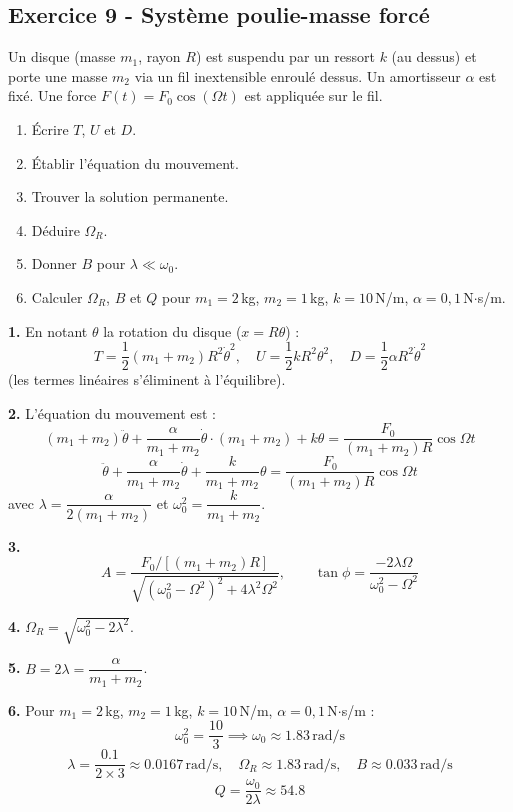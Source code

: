 \documentclass[12pt,a4paper]{article}
\begin{document}
\subsection*{Exercice 9 - Système poulie-masse forcé \niveau{\difficile}}

\begin{boiteexercice}
Un disque (masse $m_1$, rayon $R$) est suspendu par un ressort $k$ (au dessus) et porte une masse $m_2$ via un fil inextensible enroulé dessus. Un amortisseur $\alpha$ est fixé. Une force $F(t) = F_0\cos(\Omega t)$ est appliquée sur le fil.
\begin{enumerate}
  \item Écrire $T$, $U$ et $D$.
  \item Établir l'équation du mouvement.
  \item Trouver la solution permanente.
  \item Déduire $\Omega_R$.
  \item Donner $B$ pour $\lambda \ll \omega_0$.
  \item Calculer $\Omega_R$, $B$ et $Q$ pour $m_1=2$\,kg, $m_2=1$\,kg, $k=10$\,N/m, $\alpha=0{,}1$\,N$\cdot$s/m.
\end{enumerate}
\end{boiteexercice}

\begin{boitecorrige}
\textbf{1.} En notant $\theta$ la rotation du disque ($x = R\theta$) :
\[
T = \frac{1}{2}(m_1+m_2)R^2\dot\theta^2, \quad U = \frac{1}{2}kR^2\theta^2, \quad D = \frac{1}{2}\alpha R^2\dot\theta^2
\]
(les termes linéaires s'éliminent à l'équilibre).

\textbf{2.} L'équation du mouvement est :
\[
(m_1+m_2)\ddot\theta + \frac{\alpha}{m_1+m_2}\dot\theta\cdot(m_1+m_2) + k\theta = \frac{F_0}{(m_1+m_2)R}\cos\Omega t
\]
\[
\ddot\theta + \frac{\alpha}{m_1+m_2}\dot\theta + \frac{k}{m_1+m_2}\theta = \frac{F_0}{(m_1+m_2)R}\cos\Omega t
\]
avec $\lambda = \dfrac{\alpha}{2(m_1+m_2)}$ et $\omega_0^2 = \dfrac{k}{m_1+m_2}$.

\textbf{3.}
\[
A = \frac{F_0/[(m_1+m_2)R]}{\sqrt{(\omega_0^2-\Omega^2)^2+4\lambda^2\Omega^2}}, \qquad \tan\phi = \frac{-2\lambda\Omega}{\omega_0^2-\Omega^2}
\]

\textbf{4.} $\Omega_R = \sqrt{\omega_0^2 - 2\lambda^2}$.

\textbf{5.} $B = 2\lambda = \dfrac{\alpha}{m_1+m_2}$.

\textbf{6.} Pour $m_1=2$\,kg, $m_2=1$\,kg, $k=10$\,N/m, $\alpha=0{,}1$\,N$\cdot$s/m :
\[
\omega_0^2 = \frac{10}{3} \implies \omega_0 \approx 1.83\,\text{rad/s}
\]
\[
\lambda = \frac{0.1}{2\times3} \approx 0.0167\,\text{rad/s}, \quad \Omega_R \approx 1.83\,\text{rad/s}, \quad B \approx 0.033\,\text{rad/s}
\]
\[
Q = \frac{\omega_0}{2\lambda} \approx 54.8
\]
\end{boitecorrige}
\end{document}
